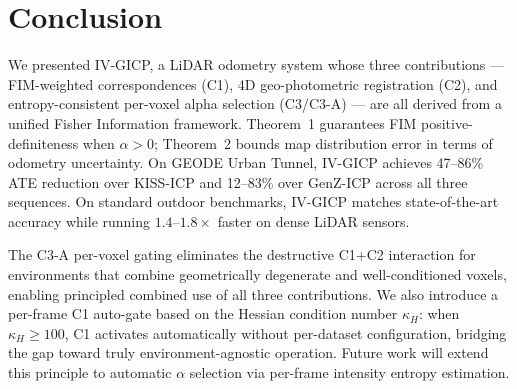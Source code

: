 \documentclass[letterpaper, 10pt, conference]{ieeeconf}
\begin{document}
\section{Conclusion}\label{sec:conclusion}

We presented IV-GICP, a LiDAR odometry system whose three contributions —
FIM-weighted correspondences (C1), 4D geo-photometric registration (C2), and
entropy-consistent per-voxel alpha selection (C3/C3-A) — are all derived from
a unified Fisher Information framework.
Theorem~1 guarantees FIM positive-definiteness when $\alpha > 0$;
Theorem~2 bounds map distribution error in terms of odometry uncertainty.
On GEODE Urban Tunnel, IV-GICP achieves 47--86\% ATE reduction over KISS-ICP
and 12--83\% over GenZ-ICP across all three sequences.
On standard outdoor benchmarks, IV-GICP matches state-of-the-art accuracy
while running $1.4$--$1.8\times$ faster on dense LiDAR sensors.

The C3-A per-voxel gating eliminates the destructive C1+C2 interaction for
environments that combine geometrically degenerate and well-conditioned voxels,
enabling principled combined use of all three contributions.
We also introduce a per-frame C1 auto-gate based on the Hessian condition number
$\kappa_H$: when $\kappa_H \geq 100$, C1 activates automatically without
per-dataset configuration, bridging the gap toward truly environment-agnostic operation.
Future work will extend this principle to automatic $\alpha$ selection via
per-frame intensity entropy estimation.
\end{document}
